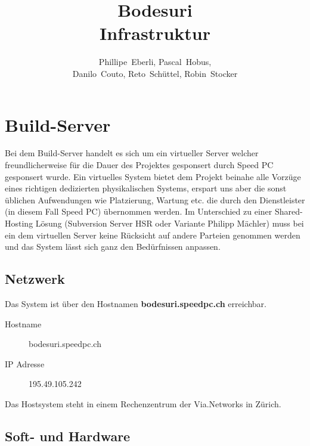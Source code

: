 \documentclass[a4paper,12pt,halfparskip,DIV14]{scrreprt}
\begin{document}
\title{Bodesuri\\Infrastruktur}
\subject{Infastruktur-Dokuemntation}
\author{Phillipe~Eberli, Pascal~Hobus, \\ Danilo~Couto, Reto~Schüttel, Robin~Stocker}
\maketitle


\tableofcontents
\thispagestyle{plain}
\newpage


\chapter{Build-Server} %
\label{cha:build_server}

Bei dem Build-Server handelt es sich um ein virtueller Server welcher freundlicherweise für die Dauer des Projektes gesponsert durch Speed PC gesponsert wurde. Ein virtuelles System bietet dem Projekt beinahe alle Vorzüge eines richtigen dedizierten physikalischen Systems, erspart uns aber die sonst üblichen Aufwendungen wie Platzierung, Wartung etc. die durch den Dienstleister (in diesem Fall Speed PC) übernommen werden. Im Unterschied zu einer Shared-Hosting Lösung (Subversion Server HSR oder Variante Philipp Mächler) muss bei ein dem virtuellen Server keine Rücksicht auf andere Parteien genommen werden und das System lässt sich ganz den Bedürfnissen anpassen.

\section{Netzwerk} %
\label{sec:netzwerk}

Das System ist über den Hostnamen \textbf{bodesuri.speedpc.ch} erreichbar. 

\begin{description}
  \item[Hostname] bodesuri.speedpc.ch
  \item[IP Adresse] 195.49.105.242
\end{description}

Das Hostsystem steht in einem Rechenzentrum der Via.Networks in Zürich.


\section{Soft- und Hardware} %
\label{sec:soft_und_hardware}
\end{document}
